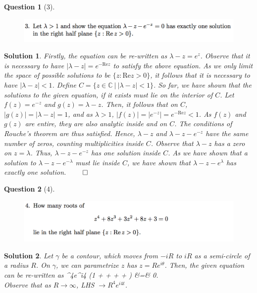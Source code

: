 \documentclass{article} %
\def\eQb#1\eQe{\begin{eqnarray*}#1\end{eqnarray*}}
\theoremstyle{quest}
\newtheorem*{question}{Question}
\newtheorem*{solution}{Solution}
\begin{document}
\begin{question}[3]
\hfill
\begin{figure}[h!]
\centering
\includegraphics[width=1\textwidth]{cv-9-3}
\end{figure}
\end{question}
\begin{solution}
Firstly, the equation can be re-written as $\lambda - z = e^{z}$.
Observe that it is necessary to have
$| \lambda - z | = e^{-\text{Re} z}$ to satisfy the above equation.
As we only limit the space of possible solutions to be $\{ z : \text{Re} z 
> 0\}$, it follows that it is necessary to have $|\lambda - z | < 1$.
Define $C = \{ z \in \mathbb{C} \> | \> | \lambda - z| < 1 \}$. So far,
we have shown that the solutions to the given equation, if it exists
must lie on the interior of $C$. 
Let $f(z) = e^{-z}$
and $g(z) = \lambda - z $. Then, it follows that on $C$, $|g(z)| = |\lambda
-z | = 1$, and as $\lambda > 1$, $|f(z)| = |e^{-z}| = e^{-\text{Re}z} < 1$. 
As $f(z)$ and $g(z)$ are entire, they are also analytic inside
and on $C$. The conditions of Rouche's theorem are thus satisfied. Hence,
$\lambda - z$ and $\lambda - z - e^{-z}$ have the same number of zeros, 
counting multiplicities inside $C$. Observe that $\lambda - z$ has a 
zero on $z = \lambda$. Thus, $\lambda -z -e^{-z}$ has one solution
inside $C$. As we have shown that a solution to $\lambda -z -e^{-\lambda}$
must lie inside $C$, we have shown that $\lambda -z -e^{\lambda}$ has
exactly one solution. \hfill $\qed$

\end{solution}

\bigskip

\begin{question}[4]
\hfill
\begin{figure}[h!]
\centering
\includegraphics[width=1\textwidth]{cv-9-4}
\end{figure}
\end{question}
\begin{solution}
Let $\gamma$ be a contour, which moves from $-iR$ to $iR$ as a semi-circle
of a radius $R$. On $\gamma$, we can parametrize $z$ has $z = Re^{i\theta}$.
Then, the given equation can be re-written as 
\eQb
R^{4}e^{i4\theta} (1 +  + 
 + + 
) &=& 0. \\
\eQe 
Observe that as $R \to \infty$, LHS $\to R^4e^{i4t}$. 
\end{solution}
\end{document}
